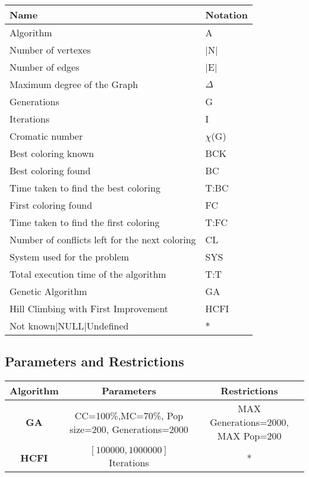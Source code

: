 \documentclass[10pt]{article}
\begin{document}
\begin{tabular}{|l|l|}
\hline
\rowcolor{lightgray}
\hline \textbf{Name} & \textbf{Notation}   \\ \hline
   Algorithm & A \\ \hline
   Number of vertexes & $|$N$|$ \\ \hline
   Number of edges & $|$E$|$ \\ \hline
   Maximum degree of the Graph & $\Delta$ \\ \hline
   Generations & G \\ \hline
   Iterations & I \\ \hline
   Cromatic number & $\chi$(G) \\ \hline
   Best coloring known & BCK \\ \hline
   Best coloring found & BC \\ \hline
   Time taken to find the best coloring & T:BC \\ \hline
   First coloring found & FC \\ \hline
   Time taken to find the first coloring & T:FC \\ \hline
   Number of conflicts left for the next coloring & CL \\ \hline
   System used for the problem & SYS \\ \hline
   Total execution time of the algorithm &T:T \\ \hline
   Genetic Algorithm & GA \\ \hline
   Hill Climbing with First Improvement &HCFI \\ \hline
   Not known$|$NULL$|$Undefined & $*$ \\ \hline
   
\end{tabular}
\subsection{Parameters and Restrictions}
\vspace{2em}
\begin{tabular}{|c|c|c|}
\hline
\rowcolor{lightgray} 
\hline
\textbf{Algorithm}&\textbf{Parameters} &\textbf{Restrictions} \\ \hline
\textbf{GA} &{CC=100\%,MC=70\%, Pop size=200, Generations=2000}&{MAX Generations=2000, MAX Pop=200} \\ \hline
\textbf{HCFI} &$\left[100000,1000000\right]$ Iterations&* \\ \hline
\end{tabular}
\end{document}
